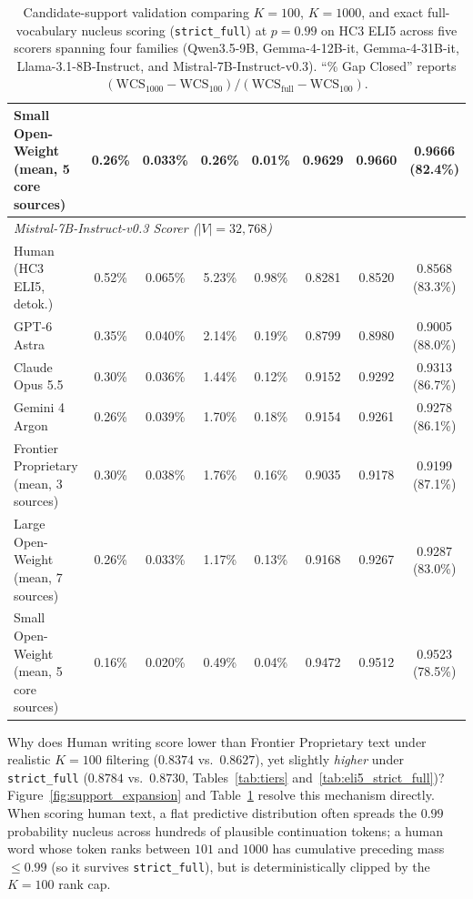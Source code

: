 \documentclass[11pt]{article}
\begin{document}
\begin{table}[t]
{\begin{tabular}{lccccccc}
Small Open-Weight (mean, 5 core sources) & 0.26\% & 0.033\% & 0.26\% & 0.01\% & 0.9629 & 0.9660 & 0.9666 (82.4\%) \\
\midrule
\multicolumn{8}{l}{\textit{Mistral-7B-Instruct-v0.3 Scorer ($|V| = 32{{,}}768$)}} \\
Human (HC3 ELI5, detok.) & 0.52\% & 0.065\% & 5.23\% & 0.98\% & 0.8281 & 0.8520 & 0.8568 (83.3\%) \\
GPT-6 Astra & 0.35\% & 0.040\% & 2.14\% & 0.19\% & 0.8799 & 0.8980 & 0.9005 (88.0\%) \\
Claude Opus 5.5 & 0.30\% & 0.036\% & 1.44\% & 0.12\% & 0.9152 & 0.9292 & 0.9313 (86.7\%) \\
Gemini 4 Argon & 0.26\% & 0.039\% & 1.70\% & 0.18\% & 0.9154 & 0.9261 & 0.9278 (86.1\%) \\
Frontier Proprietary (mean, 3 sources) & 0.30\% & 0.038\% & 1.76\% & 0.16\% & 0.9035 & 0.9178 & 0.9199 (87.1\%) \\
Large Open-Weight (mean, 7 sources) & 0.26\% & 0.033\% & 1.17\% & 0.13\% & 0.9168 & 0.9267 & 0.9287 (83.0\%) \\
Small Open-Weight (mean, 5 core sources) & 0.16\% & 0.020\% & 0.49\% & 0.04\% & 0.9472 & 0.9512 & 0.9523 (78.5\%) \\
\bottomrule
\end{tabular}%
}
\caption{Candidate-support validation comparing $K=100$, $K=1000$, and exact full-vocabulary nucleus scoring (\texttt{strict\_full}) at $p=0.99$ on HC3 ELI5 across five scorers spanning four families (Qwen3.5-9B, Gemma-4-12B-it, Gemma-4-31B-it, Llama-3.1-8B-Instruct, and Mistral-7B-Instruct-v0.3). ``\% Gap Closed'' reports $(\text{WCS}_{1000} - \text{WCS}_{100}) / (\text{WCS}_{\text{full}} - \text{WCS}_{100})$.}
\label{tab:top1000}
\end{table}

Why does Human writing score lower than Frontier Proprietary text under realistic $K=100$ filtering ($0.8374$ vs.\ $0.8627$), yet slightly \emph{higher} under \texttt{strict\_full} ($0.8784$ vs.\ $0.8730$, Tables~\ref{tab:tiers} and~\ref{tab:eli5_strict_full})? Figure~\ref{fig:support_expansion} and Table~\ref{tab:top1000} resolve this mechanism directly. When scoring human text, a flat predictive distribution often spreads the $0.99$ probability nucleus across hundreds of plausible continuation tokens; a human word whose token ranks between $101$ and $1000$ has cumulative preceding mass $\le 0.99$ (so it survives \texttt{strict\_full}), but is deterministically clipped by the $K=100$ rank cap.
\end{document}
